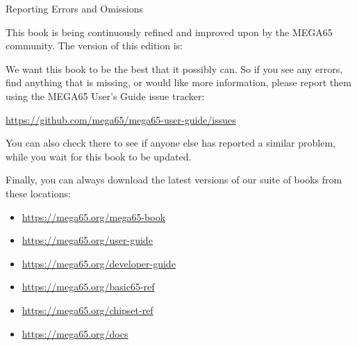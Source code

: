 \newpage
{\huge Reporting Errors and Omissions}\vspace{1cm}

This book is being continuously refined and improved upon by the MEGA65 community.
The version of this edition is:



We want this book to be the best that it possibly can. So if you see any errors,
find anything that is missing, or would like more information,
please report them using the MEGA65 User's Guide issue tracker:

\url{https://github.com/mega65/mega65-user-guide/issues}

You can also check there to see if anyone else has reported a similar problem,
while you wait for this book to be updated.

Finally, you can always download the latest versions of our suite of books from these locations:

\begin{itemize}
\item \url{https://mega65.org/mega65-book}
\item \url{https://mega65.org/user-guide}
\item \url{https://mega65.org/developer-guide}
\item \url{https://mega65.org/basic65-ref}
\item \url{https://mega65.org/chipset-ref}
\item \url{https://mega65.org/docs}
\end{itemize}

